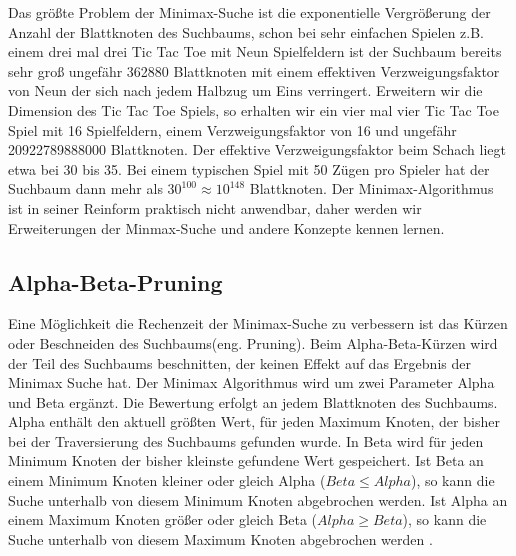 Das größte Problem der Minimax-Suche ist die exponentielle Vergrößerung der Anzahl der Blattknoten des Suchbaums, schon bei sehr einfachen Spielen z.B. einem drei mal drei Tic Tac Toe mit Neun Spielfeldern ist der Suchbaum bereits sehr groß ungefähr 362880 Blattknoten mit einem effektiven Verzweigungsfaktor von Neun der sich nach jedem Halbzug um Eins verringert. Erweitern wir die Dimension des Tic Tac Toe Spiels, so erhalten wir ein vier mal vier Tic Tac Toe Spiel mit 16 Spielfeldern, einem Verzweigungsfaktor von 16 und ungefähr 20922789888000 Blattknoten. Der effektive Verzweigungsfaktor beim Schach liegt etwa bei 30 bis 35. Bei einem typischen Spiel mit 50 Zügen pro Spieler hat der Suchbaum dann mehr als $30^{100} \approx 10^{148}$ Blattknoten\cite[114]{Ertel}. Der Minimax-Algorithmus ist in seiner Reinform praktisch nicht anwendbar, daher werden wir Erweiterungen der Minmax-Suche und andere Konzepte kennen lernen.

\subsection{Alpha-Beta-Pruning}
Eine Möglichkeit die Rechenzeit der Minimax-Suche zu verbessern ist das Kürzen oder Beschneiden des Suchbaums(eng. Pruning). Beim Alpha-Beta-Kürzen wird der Teil des Suchbaums beschnitten, der keinen Effekt auf das Ergebnis der Minimax Suche hat. Der Minimax Algorithmus wird um zwei Parameter Alpha und Beta ergänzt. Die Bewertung erfolgt an jedem Blattknoten des Suchbaums. Alpha enthält den aktuell größten Wert, für jeden Maximum Knoten, der bisher bei der Traversierung des Suchbaums gefunden wurde. In Beta wird für jeden Minimum Knoten der bisher kleinste gefundene Wert gespeichert. Ist Beta an einem Minimum Knoten kleiner oder gleich Alpha ($Beta \leq Alpha$), so kann die Suche unterhalb von diesem Minimum Knoten abgebrochen werden. Ist Alpha an einem Maximum Knoten größer oder gleich Beta ($Alpha \geq Beta$), so kann die Suche unterhalb von diesem Maximum Knoten abgebrochen werden \cite[116]{Ertel}. \\

